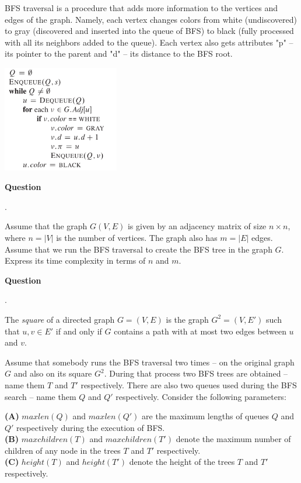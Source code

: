 \documentclass[a4paper,12pt]{article}
\newcounter{mcounter}
\newcommand\showmcounter{\addtocounter{mcounter}{1}\themcounter}
\begin{document}
{\begin{enumerate}[label=1.\Alph*.]
{\footnotesize BFS traversal is a procedure that adds more information to the vertices and edges of the 
graph. Namely, each vertex changes colors from white (undiscovered) to gray (discovered and inserted 
into the queue of BFS) to black (fully processed with all its neighbors added
to the queue). Each vertex also gets attributes "p" -- its pointer to the parent and 
"d" -- its distance to the BFS root.

\begin{center}
\includegraphics[width=2in]{ds-exam3/bfs-pseudocode.png}
\end{center}
}



\vspace{10pt}
{\bf Question \showmcounter.} 
Assume that the graph $G(V,E)$ is given by an adjacency matrix of size $n \times n$, 
where $n = |V|$ is the number of vertices. The graph also has $m = |E|$ edges.
Assume that we run the BFS traversal to create the BFS tree in the graph $G$. 
Express its time complexity in terms of $n$ and $m$. 

\vspace{10pt}
{\bf Question \showmcounter.} 
The {\em square} of a directed graph $G=(V,E)$ is the graph $G^2=(V, E')$ such that
$u,v \in E'$ if and only if $G$ contains a path with at most two edges between $u$ and $v$.

Assume that somebody runs the BFS traversal two times -- on the original graph $G$
and also on its square $G^2$. During that process 
two BFS trees are obtained -- name them $T$ and $T'$ respectively. 
There are also two queues used during the BFS search -- name them $Q$ and $Q'$ respectively.
Consider the following parameters:

{\bf (A)} $maxlen(Q)$ and $maxlen(Q')$ are the maximum lengths of queues $Q$ and $Q'$ respectively 
during the execution of BFS.\\
{\bf (B)} $maxchildren(T)$ and $maxchildren(T')$ denote the maximum number of children of any node in 
the trees $T$ and $T'$ respectively.\\
{\bf (C)} $height(T)$ and $height(T')$ denote the height of the trees $T$ and $T'$ respectively.


\end{enumerate}}
\end{document}

